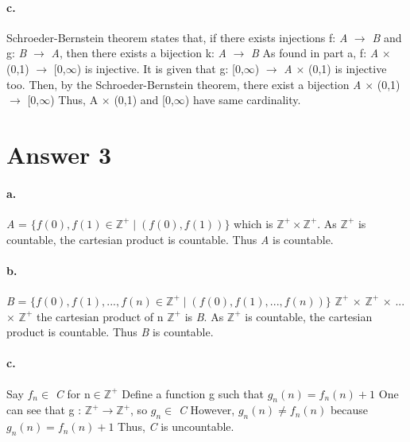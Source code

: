 \documentclass[11pt]{article}
\begin{document}
\paragraph{c.} Schroeder-Bernstein theorem states that, if there exists injections f: \emph{A} $\rightarrow$ \emph{B} and g: \emph{B} $\rightarrow$ \emph{A}, then there exists a bijection k: \emph{A} $\rightarrow$ \emph{B} \newline
As found in part a, f: \emph{A} $\times$ (0,1) $\rightarrow$ [0,$\infty$) is injective. \newline
It is given that g: [0,$\infty$) $\rightarrow$ \emph{A} $\times$ (0,1) is injective too. \newline
Then, by the Schroeder-Bernstein theorem, there exist a bijection \emph{A} $\times$ (0,1) $\rightarrow$ [0,$\infty$) \newline
Thus, A $\times$ (0,1) and [0,$\infty$) have same cardinality.
\newpage
\section*{Answer 3}
\paragraph{a.} \emph{A} = $\{f(0), f(1) \in \mathbb{Z}^+ \mid (f(0),f(1)) \}$ which is $\mathbb{Z}^+ \times \mathbb{Z}^+ $. As $\mathbb{Z}^+$ is countable, the cartesian product is countable. Thus \emph{A} is countable.
\paragraph{b.} \emph{B} = $\{f(0), f(1),..., f(n) \in \mathbb{Z}^+ \mid (f(0),f(1),...,f(n)) \}$ \newline $\mathbb{Z}^+$ $\times$ $\mathbb{Z}^+$ $\times$ ... $\times$ $\mathbb{Z}^+$ the cartesian product of n $\mathbb{Z}^+$ is \emph{B}. As $\mathbb{Z}^+$ is countable, the cartesian product is countable. Thus \emph{B} is countable.
\paragraph{c.} Say $f_n \in$ \emph{C} for n$\in \mathbb{Z}^+$ Define a function g such that\newline
$g_n(n) = f_n(n) + 1$ \newline
One can see that g : $\mathbb{Z}^+ \rightarrow \mathbb{Z^+}$, so $g_n \in$ \emph{C} \newline
However, $g_n(n) \neq f_n(n)$ because $g_n(n) = f_n(n) + 1$ \newline
Thus, \emph{C} is uncountable.
\end{document}
